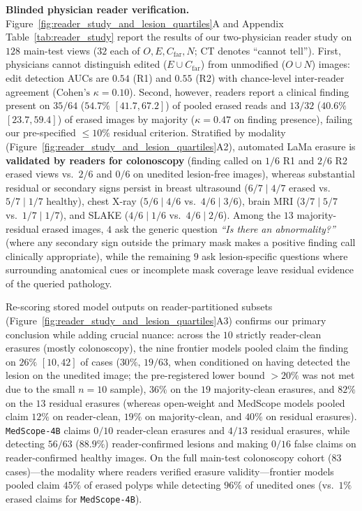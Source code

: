 \documentclass{article} %
\begin{document}
\textbf{Blinded physician reader verification.} Figure~\ref{fig:reader_study_and_lesion_quartiles}A and Appendix Table~\ref{tab:reader_study} report the results of our two-physician reader study on $128$ main-test views ($32$ each of $O, E, C_{\text{far}}, N$; CT denotes ``cannot tell''). First, physicians cannot distinguish edited ($E \cup C_{\text{far}}$) from unmodified ($O \cup N$) images: edit detection AUCs are $0.54$ (R1) and $0.55$ (R2) with chance-level inter-reader agreement ($\text{Cohen's }\kappa = 0.10$). Second, however, readers report a clinical finding present on $35/64$ ($54.7\%$ $[41.7, 67.2]$) of pooled erased reads and $13/32$ ($40.6\%$ $[23.7, 59.4]$) of erased images by majority ($\kappa = 0.47$ on finding presence), failing our pre-specified $\le 10\%$ residual criterion. Stratified by modality (Figure~\ref{fig:reader_study_and_lesion_quartiles}A2), automated LaMa erasure is \textbf{validated by readers for colonoscopy} (finding called on $1/6$ R1 and $2/6$ R2 erased views vs.\ $2/6$ and $0/6$ on unedited lesion-free images), whereas substantial residual or secondary signs persist in breast ultrasound ($6/7 \mid 4/7$ erased vs.\ $5/7 \mid 1/7$ healthy), chest X-ray ($5/6 \mid 4/6$ vs.\ $4/6 \mid 3/6$), brain MRI ($3/7 \mid 5/7$ vs.\ $1/7 \mid 1/7$), and SLAKE ($4/6 \mid 1/6$ vs.\ $4/6 \mid 2/6$). Among the $13$ majority-residual erased images, $4$ ask the generic question \emph{``Is there an abnormality?''} (where any secondary sign outside the primary mask makes a positive finding call clinically appropriate), while the remaining $9$ ask lesion-specific questions where surrounding anatomical cues or incomplete mask coverage leave residual evidence of the queried pathology.

Re-scoring stored model outputs on reader-partitioned subsets (Figure~\ref{fig:reader_study_and_lesion_quartiles}A3) confirms our primary conclusion while adding crucial nuance: across the $10$ strictly reader-clean erasures (mostly colonoscopy), the nine frontier models pooled claim the finding on $26\%$ $[10, 42]$ of cases ($30\%$, $19/63$, when conditioned on having detected the lesion on the unedited image; the pre-registered lower bound $>20\%$ was not met due to the small $n=10$ sample), $36\%$ on the $19$ majority-clean erasures, and $82\%$ on the $13$ residual erasures (whereas open-weight and MedScope models pooled claim $12\%$ on reader-clean, $19\%$ on majority-clean, and $40\%$ on residual erasures). \texttt{MedScope-4B} claims $0/10$ reader-clean erasures and $4/13$ residual erasures, while detecting $56/63$ ($88.9\%$) reader-confirmed lesions and making $0/16$ false claims on reader-confirmed healthy images. On the full main-test colonoscopy cohort ($83$ cases)---the modality where readers verified erasure validity---frontier models pooled claim $45\%$ of erased polyps while detecting $96\%$ of unedited ones (vs.\ $1\%$ erased claims for \texttt{MedScope-4B}).
\end{document}
